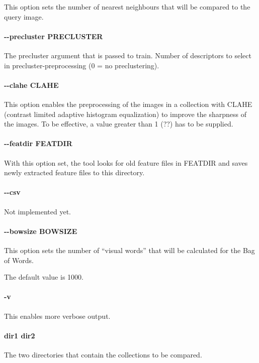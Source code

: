 This option sets the number of nearest neighbours that will be compared to the query
image. 

\paragraph{\ttfamily -{}-precluster PRECLUSTER}

The precluster argument that is passed to {\ttfamily train}.
Number of descriptors to select in precluster-preprocessing (0 = no preclustering).

\paragraph{\ttfamily -{}-clahe CLAHE}

This option enables the preprocessing of the images in a collection with CLAHE 
(contrast limited adaptive histogram equalization) to improve the sharpness
of the images. To be effective, a value greater than 1 (??) has to be supplied.


\paragraph{\ttfamily -{}-featdir FEATDIR}

With this option set, the tool looks for old feature files in FEATDIR and saves
newly extracted feature files to this directory.

\paragraph{\ttfamily -{}-csv}

Not implemented yet.

\paragraph{\ttfamily -{}-bowsize BOWSIZE}

This option sets the number of ``visual words'' that will be
calculated for the Bag of Words.

The default value is 1000.

\paragraph{\ttfamily -v}

This enables more verbose output.

\paragraph{\ttfamily dir1 dir2}

The two directories that contain the collections to be compared.
